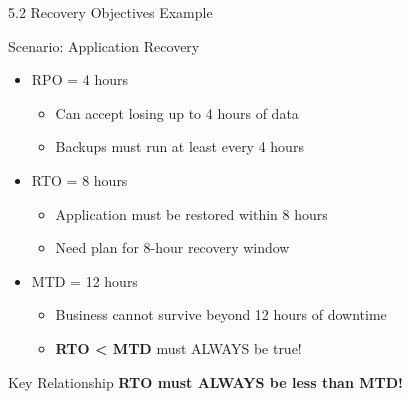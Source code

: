 \documentclass[9pt]{beamer}  %
\begin{document}
	\begin{frame}{5.2 Recovery Objectives Example}
		\begin{block}{Scenario: Application Recovery}
			\begin{itemize}
				\item RPO = 4 hours
				\begin{itemize}
					\item Can accept losing up to 4 hours of data
					\item Backups must run at least every 4 hours
				\end{itemize}
				\item RTO = 8 hours
				\begin{itemize}
					\item Application must be restored within 8 hours
					\item Need plan for 8-hour recovery window
				\end{itemize}
				\item MTD = 12 hours
				\begin{itemize}
					\item Business cannot survive beyond 12 hours of downtime
					\item \textbf{RTO < MTD} must ALWAYS be true!
				\end{itemize}
			\end{itemize}
		\end{block}
		
		\begin{exampleblock}{Key Relationship}
			\centering
			\Large{\textbf{RTO must ALWAYS be less than MTD!}}
		\end{exampleblock}
	\end{frame}
	
\end{document}
